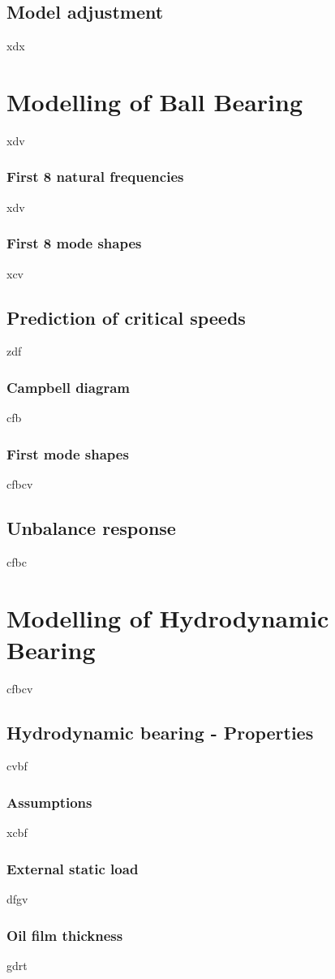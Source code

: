 \subsection{Model adjustment}
xdx
\section{Modelling of Ball Bearing}
xdv
\subsubsection{First 8 natural frequencies}
xdv
\subsubsection{First 8 mode shapes}
xcv
\subsection{Prediction of critical speeds}
zdf
\subsubsection{Campbell diagram}
cfb
\subsubsection{First mode shapes}
cfbcv
\subsection{Unbalance response}
cfbc
\section{Modelling of Hydrodynamic Bearing}
cfbcv
\subsection{Hydrodynamic bearing - Properties}
cvbf
\subsubsection{Assumptions}
xcbf
\subsubsection{External static load}
dfgv
\subsubsection{Oil film thickness}
gdrt
